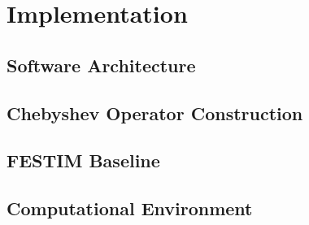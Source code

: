 \section{Implementation}

\subsection{Software Architecture}

\subsection{Chebyshev Operator Construction}

\subsection{FESTIM Baseline}

\subsection{Computational Environment}
